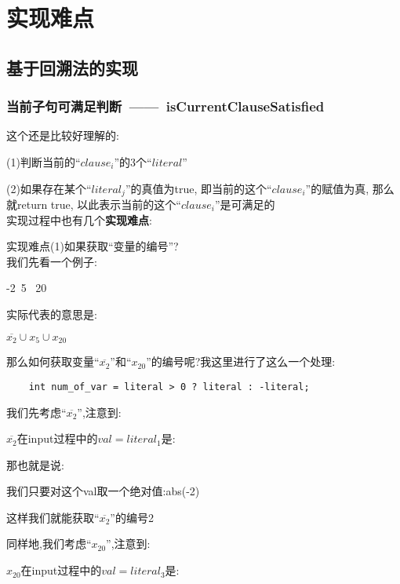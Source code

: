 \section{实现难点}
    \subsection{基于回溯法的实现}

        \subsubsection{当前子句可满足判断\ ——\ isCurrentClauseSatisfied}
        \noindent
        这个还是比较好理解的:\par
        (1)判断当前的``$clause_{i}$''的3个``$literal$''\par
        (2)如果存在某个``$literal_{j}$''的真值为true,
        即当前的这个``$clause_{i}$''的赋值为真,
        那么就return true,
        以此表示当前的这个``$clause_{i}$''是可满足的\\
        实现过程中也有几个\textbf{实现难点}:\par
        实现难点(1)如果获取``变量的编号''?\\
        我们先看一个例子:
        \begin{center}
            -2\ 5 \ 20
        \end{center}
        \noindent
        实际代表的意思是:
        \begin{center}
            $\overline{x_{2}} \cup x_{5} \cup x_{20}$
        \end{center}
        那么如何获取变量``$\overline{x_{2}}$''和``$x_{20}$''的编号呢?我这里进行了这么一个处理:
        \begin{lstlisting}
    int num_of_var = literal > 0 ? literal : -literal;
        \end{lstlisting}
        \noindent
        我们先考虑``$\overline{x_{2}}$'',注意到:
        \begin{center}
            $\overline{x_{2}}$在input过程中的$val=literal_{1}$是:
        \end{center}
        那也就是说:
        \begin{center}
            我们只要对这个val取一个绝对值:\quad abs(-2)
        \end{center}
        这样我们就能获取``$\overline{x_{2}}$''的编号2\par
        同样地,我们考虑``$x_{20}$'',注意到:
        \begin{center}
            $x_{20}$在input过程中的$val=literal_{3}$是:
        \end{center}
